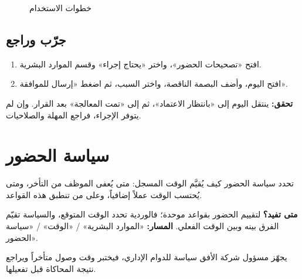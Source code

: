 \begin{figure}[H]
\centering
{}
\rclegend
\caption{خطوات الاستخدام}
\label{fig:hr-feature-attendance-corrections-flow}
\end{figure}

\subsection{جرّب وراجع}

\begin{enumerate}
  \item افتح «تصحيحات الحضور»، واختر «يحتاج إجراء» وقسم الموارد البشرية.
  \item افتح اليوم، وأضف البصمة الناقصة، واختر السبب، ثم اضغط «إرسال للموافقة».
\end{enumerate}

\textbf{تحقق:} ينتقل اليوم إلى «بانتظار الاعتماد»، ثم إلى «تمت المعالجة» بعد القرار. وإن لم يتوفر الإجراء، فراجع المهلة والصلاحيات.

\clearpage
\section{سياسة الحضور}
\label{sec:hr-feature-attendance-policy}

تحدد سياسة الحضور كيف يُقيَّم الوقت المسجل: متى يُعفى الموظف من التأخر، ومتى يُحتسب الوقت عملاً إضافياً، وعلى من تنطبق هذه القواعد.

\textbf{متى تفيد؟} لتقييم الحضور بقواعد موحدة؛ فالوردية تحدد الوقت المتوقع، والسياسة تقيّم الفرق بينه وبين الوقت الفعلي. \textbf{المسار:} «الموارد البشرية» / «الوقت» / «سياسة الحضور».

\begin{rcnote}
يجهّز مسؤول شركة الأفق سياسة للدوام الإداري، فيختبر وقت وصول متأخراً ويراجع نتيجة المحاكاة قبل تفعيلها.
\end{rcnote}

